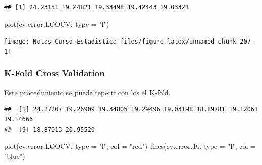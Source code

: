 \documentclass[
  12pt,
]{book}
\newenvironment{Shaded}{\begin{snugshade}}{\end{snugshade}}
\newcommand{\AttributeTok}[1]{\textcolor[rgb]{0.77,0.63,0.00}{#1}}
\newcommand{\ControlFlowTok}[1]{\textcolor[rgb]{0.13,0.29,0.53}{\textbf{#1}}}
\newcommand{\DecValTok}[1]{\textcolor[rgb]{0.00,0.00,0.81}{#1}}
\newcommand{\FloatTok}[1]{\textcolor[rgb]{0.00,0.00,0.81}{#1}}
\newcommand{\FunctionTok}[1]{\textcolor[rgb]{0.00,0.00,0.00}{#1}}
\newcommand{\NormalTok}[1]{#1}
\newcommand{\OtherTok}[1]{\textcolor[rgb]{0.56,0.35,0.01}{#1}}
\newcommand{\SpecialCharTok}[1]{\textcolor[rgb]{0.00,0.00,0.00}{#1}}
\newcommand{\StringTok}[1]{\textcolor[rgb]{0.31,0.60,0.02}{#1}}
\theoremstyle{definition}
\theoremstyle{definition}
\theoremstyle{definition}
\theoremstyle{definition}
\theoremstyle{remark}
\begin{document}
\begin{verbatim}
## [1] 24.23151 19.24821 19.33498 19.42443 19.03321
\end{verbatim}

\begin{Shaded}
\begin{Highlighting}[]
\FunctionTok{plot}\NormalTok{(cv.error.LOOCV, }\AttributeTok{type =} \StringTok{"l"}\NormalTok{)}
\end{Highlighting}
\end{Shaded}

\begin{center}\texttt{[image: Notas-Curso-Estadistica\_files/figure-latex/unnamed-chunk-207-1]} \end{center}

\hypertarget{k-fold-cross-validation}{%
\subsubsection{K-Fold Cross Validation}\label{k-fold-cross-validation}}

Este procedimiento se puede repetir con los el K-fold.

\begin{Shaded}
\end{Shaded}

\begin{verbatim}
##  [1] 24.27207 19.26909 19.34805 19.29496 19.03198 18.89781 19.12061 19.14666
##  [9] 18.87013 20.95520
\end{verbatim}

\begin{Shaded}
\begin{Highlighting}[]
\FunctionTok{plot}\NormalTok{(cv.error.LOOCV, }\AttributeTok{type =} \StringTok{"l"}\NormalTok{, }\AttributeTok{col =} \StringTok{"red"}\NormalTok{)}
\FunctionTok{lines}\NormalTok{(cv.error}\FloatTok{.10}\NormalTok{, }\AttributeTok{type =} \StringTok{"l"}\NormalTok{, }\AttributeTok{col =} \StringTok{"blue"}\NormalTok{)}
\end{Highlighting}
\end{Shaded}
\end{document}
